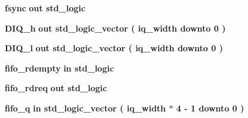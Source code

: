 \begin{DoxyCompactItemize}
\item 
{\bf fsync}  {\bfseries {\bfseries \textcolor{keywordflow}{out}\textcolor{vhdlchar}{ }}} {\bfseries \textcolor{comment}{std\+\_\+logic}\textcolor{vhdlchar}{ }} 
\item 
{\bf D\+I\+Q\+\_\+h}  {\bfseries {\bfseries \textcolor{keywordflow}{out}\textcolor{vhdlchar}{ }}} {\bfseries \textcolor{comment}{std\+\_\+logic\+\_\+vector}\textcolor{vhdlchar}{ }\textcolor{vhdlchar}{(}\textcolor{vhdlchar}{ }\textcolor{vhdlchar}{ }\textcolor{vhdlchar}{ }\textcolor{vhdlchar}{ }{\bfseries {\bf iq\+\_\+width}} \textcolor{vhdlchar}{ }\textcolor{keywordflow}{downto}\textcolor{vhdlchar}{ }\textcolor{vhdlchar}{ } \textcolor{vhdldigit}{0} \textcolor{vhdlchar}{ }\textcolor{vhdlchar}{)}\textcolor{vhdlchar}{ }} 
\item 
{\bf D\+I\+Q\+\_\+l}  {\bfseries {\bfseries \textcolor{keywordflow}{out}\textcolor{vhdlchar}{ }}} {\bfseries \textcolor{comment}{std\+\_\+logic\+\_\+vector}\textcolor{vhdlchar}{ }\textcolor{vhdlchar}{(}\textcolor{vhdlchar}{ }\textcolor{vhdlchar}{ }\textcolor{vhdlchar}{ }\textcolor{vhdlchar}{ }{\bfseries {\bf iq\+\_\+width}} \textcolor{vhdlchar}{ }\textcolor{keywordflow}{downto}\textcolor{vhdlchar}{ }\textcolor{vhdlchar}{ } \textcolor{vhdldigit}{0} \textcolor{vhdlchar}{ }\textcolor{vhdlchar}{)}\textcolor{vhdlchar}{ }} 
\item 
{\bf fifo\+\_\+rdempty}  {\bfseries {\bfseries \textcolor{keywordflow}{in}\textcolor{vhdlchar}{ }}} {\bfseries \textcolor{comment}{std\+\_\+logic}\textcolor{vhdlchar}{ }} 
\item 
{\bf fifo\+\_\+rdreq}  {\bfseries {\bfseries \textcolor{keywordflow}{out}\textcolor{vhdlchar}{ }}} {\bfseries \textcolor{comment}{std\+\_\+logic}\textcolor{vhdlchar}{ }} 
\item 
{\bf fifo\+\_\+q}  {\bfseries {\bfseries \textcolor{keywordflow}{in}\textcolor{vhdlchar}{ }}} {\bfseries \textcolor{comment}{std\+\_\+logic\+\_\+vector}\textcolor{vhdlchar}{ }\textcolor{vhdlchar}{(}\textcolor{vhdlchar}{ }\textcolor{vhdlchar}{ }\textcolor{vhdlchar}{ }\textcolor{vhdlchar}{ }{\bfseries {\bf iq\+\_\+width}} \textcolor{vhdlchar}{$\ast$}\textcolor{vhdlchar}{ } \textcolor{vhdldigit}{4} \textcolor{vhdlchar}{-\/}\textcolor{vhdlchar}{ } \textcolor{vhdldigit}{1} \textcolor{vhdlchar}{ }\textcolor{keywordflow}{downto}\textcolor{vhdlchar}{ }\textcolor{vhdlchar}{ } \textcolor{vhdldigit}{0} \textcolor{vhdlchar}{ }\textcolor{vhdlchar}{)}\textcolor{vhdlchar}{ }} 
\end{DoxyCompactItemize}


